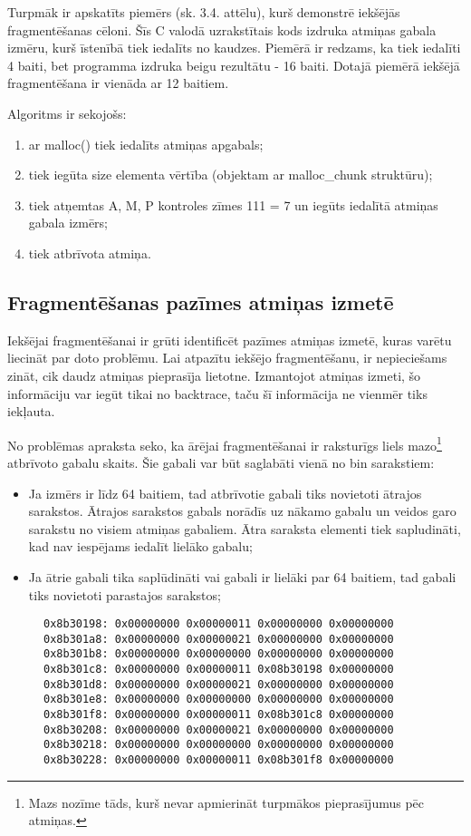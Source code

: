 Turpmāk ir apskatīts piemērs (sk. 3.4. attēlu), kurš demonstrē iekšējās fragmentēšanas cēloni.
Šīs C valodā uzrakstītais kods izdruka atmiņas gabala izmēru, kurš īstenībā tiek iedalīts no kaudzes.
Piemērā ir redzams, ka tiek iedalīti 4 baiti, bet programma izdruka beigu rezultātu - 16 baiti.
Dotajā piemērā iekšējā fragmentēšana ir vienāda ar 12 baitiem.

Algoritms ir sekojošs: 
\begin{enumerate}
\item ar malloc() tiek iedalīts atmiņas apgabals;
\item  tiek iegūta size elementa vērtība (objektam ar malloc\_chunk struktūru);
\item  tiek atņemtas A, M, P kontroles zīmes 111 = 7 un iegūts iedalītā atmiņas  gabala izmērs;
\item  tiek atbrīvota atmiņa.
\end{enumerate}



\subsection{Fragmentēšanas pazīmes atmiņas izmetē}

Iekšējai fragmentēšanai ir grūti identificēt pazīmes atmiņas izmetē, kuras varētu liecināt par doto problēmu.
Lai atpazītu iekšējo fragmentēšanu, ir nepieciešams zināt, cik daudz atmiņas pieprasīja lietotne.
Izmantojot atmiņas izmeti, šo informāciju var iegūt tikai no backtrace, taču šī informācija ne vienmēr tiks iekļauta.

No problēmas apraksta seko, ka ārējai fragmentēšanai ir raksturīgs liels mazo\footnote{Mazs nozīme tāds, kurš nevar apmierināt turpmākos pieprasījumus pēc atmiņas.} atbrīvoto gabalu skaits.
Šie gabali var būt saglabāti vienā no bin sarakstiem:
\begin{itemize}
\item Ja izmērs ir līdz 64 baitiem, tad atbrīvotie gabali tiks novietoti ātrajos sarakstos.
Ātrajos sarakstos gabals norādīs uz nākamo gabalu un veidos garo sarakstu no visiem atmiņas gabaliem.
Ātra saraksta elementi tiek sapludināti, kad nav iespējams iedalīt lielāko gabalu;
\item Ja ātrie gabali tika saplūdināti vai gabali ir lielāki par 64 baitiem, tad gabali tiks novietoti parastajos sarakstos;
\end{itemize}
\begin{figure}[h]
\begin{lstlisting}[style=customgdb]
0x8b30198: 0x00000000 0x00000011 0x00000000 0x00000000
0x8b301a8: 0x00000000 0x00000021 0x00000000 0x00000000
0x8b301b8: 0x00000000 0x00000000 0x00000000 0x00000000
0x8b301c8: 0x00000000 0x00000011 0x08b30198 0x00000000
0x8b301d8: 0x00000000 0x00000021 0x00000000 0x00000000
0x8b301e8: 0x00000000 0x00000000 0x00000000 0x00000000
0x8b301f8: 0x00000000 0x00000011 0x08b301c8 0x00000000
0x8b30208: 0x00000000 0x00000021 0x00000000 0x00000000
0x8b30218: 0x00000000 0x00000000 0x00000000 0x00000000
0x8b30228: 0x00000000 0x00000011 0x08b301f8 0x00000000
\end{lstlisting}
\caption{\textbf{\fontsize{11}{12}\selectfont {Fragmentētā kaudze}}}
\end{figure}

